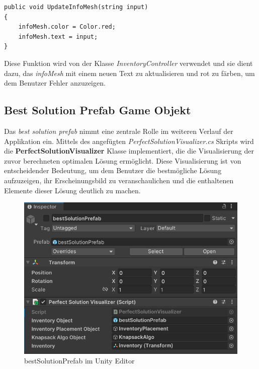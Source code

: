 \begin{lstlisting}[style=csharp, caption={Funktion um InfoMesh zu verändern}]
public void UpdateInfoMesh(string input)
{
    infoMesh.color = Color.red;
    infoMesh.text = input;
}
\end{lstlisting}
Diese Funktion wird von der Klasse \textit{InventoryController} verwendet und sie dient dazu, das \textit{infoMesh} mit
einem neuen Text zu aktualisieren und rot zu färben, um dem Benutzer Fehler anzuzeigen.

\subsection{Best Solution Prefab Game Objekt}
Das \textit{best solution prefab} nimmt eine zentrale Rolle im weiteren Verlauf der Applikation ein. Mittels des angefügten
\textit{PerfectSolutionVisualizer.cs} Skripts wird die \textbf{PerfectSolutionVisualizer} Klasse implementiert, die die
Visualisierung der zuvor berechneten optimalen Lösung ermöglicht. Diese Visualisierung ist von entscheidender Bedeutung,
um dem Benutzer die bestmögliche Lösung aufzuzeigen, ihr Erscheinungsbild zu veranschaulichen und die enthaltenen Elemente
dieser Lösung deutlich zu machen.
\begin{figure}[H]
    \centering
    \includegraphics[scale=0.8]{images/bestSolPref_Editor}
    \caption{bestSolutionPrefab im Unity Editor}
    \label{fig:bestSol_Editor}
\end{figure}

